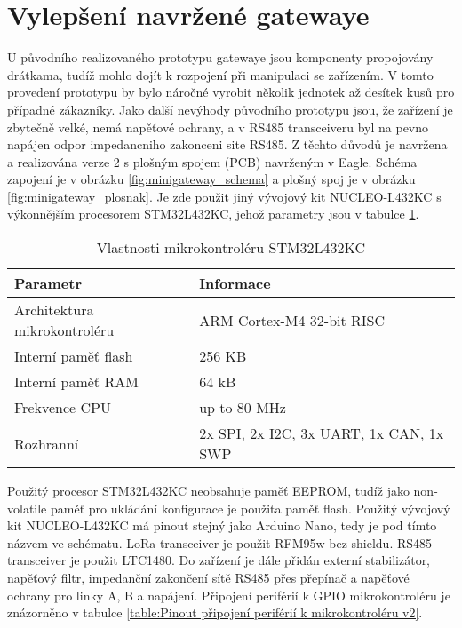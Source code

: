 \section{Vylepšení navržené gatewaye}
U původního realizovaného prototypu gatewaye jsou komponenty propojovány drátkama, tudíž mohlo dojít k rozpojení při manipulaci se zařízením. 
V tomto provedení prototypu by bylo náročné vyrobit několik jednotek až desítek kusů pro případné zákazníky.
Jako další nevýhody původního prototypu jsou, že zařízení je zbytečně velké, nemá napěťové ochrany, a v RS485 transceiveru byl na pevno napájen odpor impedancniho zakonceni site RS485.
Z těchto důvodů je navržena a realizována verze 2 s plošným spojem (PCB) navrženým v Eagle.
Schéma zapojení je v obrázku \ref{fig:minigateway_schema} a plošný spoj je v obrázku \ref{fig:minigateway_plosnak}.
Je zde použit jiný vývojový kit NUCLEO-L432KC \cite{nucleo-l432KC_ST} s výkonnějším procesorem STM32L432KC, jehož parametry jsou v tabulce \ref{tab:mcuFeatures_stm43l432kc}. 

\begin{longtable}{|l|p{3.5cm}|}
    \caption{Vlastnosti mikrokontroléru STM32L432KC \cite{nucleo-l432KC_ST}}
    \label{tab:mcuFeatures_stm43l432kc} \\
    \hline

    Parametr          & Informace            \\ \hline \hline

    Architektura mikrokontroléru & ARM Cortex-M4 32-bit RISC \\ \hline
    Interní paměť flash       & 256 KB \\ \hline
    Interní paměť RAM         & 64 kB \\ \hline
    Frekvence CPU               & up to 80 MHz \\ \hline
    Rozhranní                  & 2x SPI, 2x I2C, 3x UART, 1x CAN, 1x SWP \\ \hline

\end{longtable}

Použitý procesor STM32L432KC neobsahuje paměť EEPROM, tudíž jako non-volatile paměť pro ukládání konfigurace je použita paměť flash.
Použitý vývojový kit NUCLEO-L432KC má pinout stejný jako Arduino Nano, tedy je pod tímto názvem ve schématu.
LoRa transceiver je použit RFM95w \cite{RFM95w} bez shieldu.
RS485 transceiver je použit LTC1480. 
Do zařízení je dále přidán externí stabilizátor, napěťový filtr, impedanční zakončení sítě RS485 přes přepínač a napěťové ochrany pro linky A, B a napájení. 
Připojení periférií k GPIO mikrokontroléru je znázorněno v tabulce \ref{table:Pinout připojení periférií k mikrokontroléru v2}.

